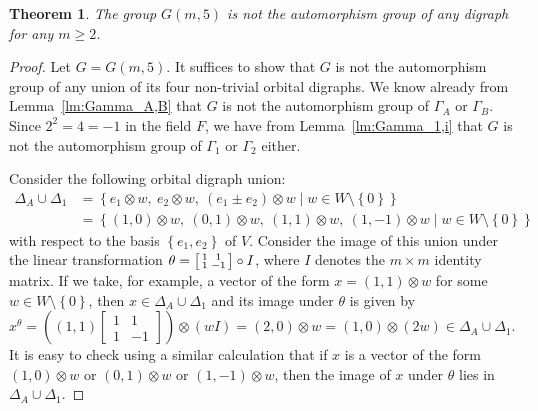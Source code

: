 \documentclass[10pt]{amsart}
\theoremstyle{definition}
\theoremstyle{plain}
\theoremstyle{plain}
\theoremstyle{plain}
\newtheorem{theorem}[theorem]{Theorem}
\theoremstyle{plain}
\begin{document}
\begin{theorem} \label{thm:q=5}
The group $G{\left(m, 5 \right)}$ is not the automorphism group of any digraph for any $m \geqslant 2$.
\end{theorem}
\begin{proof}
Let $G = G{\left(m, 5 \right)}$. It suffices to show that $G$ is not the automorphism group of any union of its four non-trivial orbital digraphs. We know already from Lemma~\ref{lm:Gamma_A,B} that $G$ is not the automorphism group of $\Gamma_A$ or $\Gamma_B$. Since $2^2 = 4 = -1$ in the field $F$, we have from Lemma~\ref{lm:Gamma_1,i} that $G$ is not the automorphism group of $\Gamma_1$ or $\Gamma_2$ either.

Consider the following orbital digraph union:
\begin{align*}
\Delta_A \cup \Delta_1 &= \left\{e_1 \otimes w,\ e_2 \otimes w,\ \left(e_1 \pm e_2 \right) \otimes w \mid w \in W \setminus \left\{0 \right\}\right\} \\
&= \left\{\left(1, 0 \right) \otimes w,\ \left(0, 1 \right) \otimes w,\ \left(1, 1 \right) \otimes w,\ \left(1, -1 \right) \otimes w \mid w \in W \setminus \left\{0 \right\}\right\}
\end{align*}
with respect to the basis $\left\{e_1, e_2 \right\}$ of $V$. Consider the image of this union under the linear transformation $\theta = \begin{bsmallmatrix} 1 & 1 \\ 1 & -1 \end{bsmallmatrix} \circ I$, where $I$ denotes the $m \times m$ identity matrix. If we take, for example, a vector of the form $x = \left(1, 1 \right) \otimes w$ for some $w \in W \setminus \left\{0 \right\}$, then $x \in \Delta_A \cup \Delta_1$ and its image under $\theta$ is given by
\begin{displaymath}
x^\theta = \left(\left(1, 1 \right) \begin{bmatrix} 1 & 1 \\ 1 & -1 \end{bmatrix} \right) \otimes \left(wI \right) = \left(2, 0 \right) \otimes w = \left(1, 0 \right) \otimes \left(2w \right) \in \Delta_A \cup \Delta_1.
\end{displaymath}
It is easy to check using a similar calculation that if $x$ is a vector of the form $\left(1, 0 \right) \otimes w$ or $\left(0, 1 \right) \otimes w$ or $\left(1, -1 \right) \otimes w$, then the image of $x$ under $\theta$ lies in $\Delta_A \cup \Delta_1$.


\end{proof}
\end{document}
